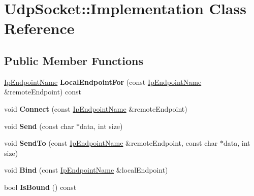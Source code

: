 \hypertarget{class_udp_socket_1_1_implementation}{}\section{Udp\+Socket\+:\+:Implementation Class Reference}
\label{class_udp_socket_1_1_implementation}
\subsection*{Public Member Functions}
\begin{DoxyCompactItemize}
\item 
\mbox{\label{class_udp_socket_1_1_implementation_a9338e0eec61c75570d9d731ed8e327b4}} 
\hyperlink{class_ip_endpoint_name}{Ip\+Endpoint\+Name} {\bfseries Local\+Endpoint\+For} (const \hyperlink{class_ip_endpoint_name}{Ip\+Endpoint\+Name} \&remote\+Endpoint) const
\item 
\mbox{\label{class_udp_socket_1_1_implementation_ae7e04b79286647f041e0c47bb1341224}} 
void {\bfseries Connect} (const \hyperlink{class_ip_endpoint_name}{Ip\+Endpoint\+Name} \&remote\+Endpoint)
\item 
\mbox{\label{class_udp_socket_1_1_implementation_ae81d7b81eea4debb516aaefcf59552a5}} 
void {\bfseries Send} (const char $\ast$data, int size)
\item 
\mbox{\label{class_udp_socket_1_1_implementation_aa3dca61e71efa21ba3d0257f8298ade0}} 
void {\bfseries Send\+To} (const \hyperlink{class_ip_endpoint_name}{Ip\+Endpoint\+Name} \&remote\+Endpoint, const char $\ast$data, int size)
\item 
\mbox{\label{class_udp_socket_1_1_implementation_adda677bc8f9feff5787a6cd7374ec945}} 
void {\bfseries Bind} (const \hyperlink{class_ip_endpoint_name}{Ip\+Endpoint\+Name} \&local\+Endpoint)
\item 
\mbox{\label{class_udp_socket_1_1_implementation_a9fa704289dbe67ca2ca035a524b2ea35}} 
bool {\bfseries Is\+Bound} () const
\item 

\end{DoxyCompactItemize}
